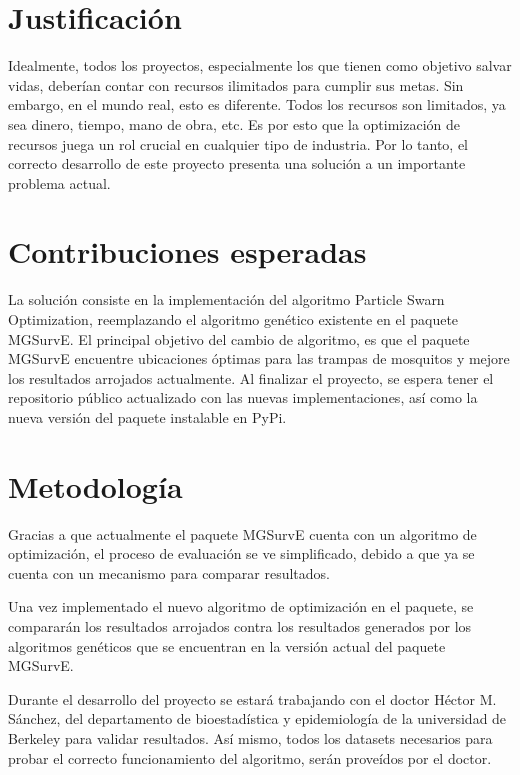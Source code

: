 \documentclass[letterpaper, 10pt, conference]{ieeeconf}
\begin{document}
\section{Justificación}
Idealmente, todos los proyectos, especialmente los que tienen como objetivo salvar vidas, deberían contar con recursos ilimitados para cumplir sus metas. Sin embargo, en el mundo real, esto es diferente. Todos los recursos son limitados, ya sea dinero, tiempo, mano de obra, etc. Es por esto que la optimización de recursos juega un rol crucial en cualquier tipo de industria. Por lo tanto, el correcto desarrollo de este proyecto presenta una solución a un importante problema actual.

\section{Contribuciones esperadas}
La solución consiste en la implementación del algoritmo Particle Swarn Optimization, reemplazando el algoritmo genético existente en el paquete MGSurvE. El principal objetivo del cambio de algoritmo, es que el paquete MGSurvE encuentre ubicaciones óptimas para las trampas de mosquitos y mejore los resultados arrojados actualmente. Al finalizar el proyecto, se espera tener el repositorio público actualizado con las nuevas implementaciones, así como la nueva versión del paquete instalable en PyPi.

\section{Metodología}
Gracias a que actualmente el paquete MGSurvE cuenta con un algoritmo de optimización, el proceso de evaluación se ve simplificado, debido a que ya se cuenta con un mecanismo para comparar resultados.

Una vez implementado el nuevo algoritmo de optimización en el paquete, se compararán los resultados arrojados contra los resultados generados por los algoritmos genéticos que se encuentran en la versión actual del paquete MGSurvE. 

Durante el desarrollo del proyecto se estará trabajando con el doctor Héctor M. Sánchez, del departamento de bioestadística y epidemiología de la universidad de Berkeley para validar resultados. Así mismo, todos los datasets necesarios para probar el correcto funcionamiento del algoritmo, serán proveídos por el doctor.
\end{document}
